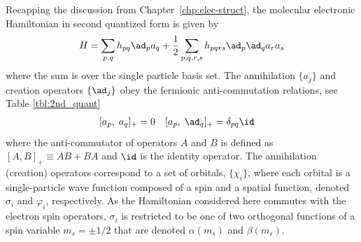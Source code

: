 \documentclass[11pt,oneside,final]{huthesis}%
\begin{document}
Recapping the discussion from Chapter~\ref{chp:elec-struct}, the molecular electronic Hamiltonian in second quantized form is given by
\begin{equation}\label{eq:ham2nd}
    H=\sum_{p,q}h_{pq}\ad_p a_q +\frac{1}{2}\sum_{p,q,r,s} h_{pqrs} \ad_p \ad_q a_r a_s
\end{equation}
where the sum is over the single particle basis set. The annihilation $\{a_j\}$ and creation operators $\{\ad_j\}$ obey the fermionic anti-commutation relations, see Table \ref{tbl:2nd_quant}
\begin{align}
&[a_p, \;a_q]_+=0& &[a_p, \;\ad_q]_+=\delta_{pq}\id
\label{:CCR}
\end{align}
where the anti-commutator of operators $A$ and $B$ is defined as $[A,B]_+\equiv AB+BA$ {and $\id$ is the identity operator.}
The annihilation (creation) operators correspond to a set of orbitals, $\{\chi_i\}$,  where each orbital is 
a single-particle wave function composed of a spin and a spatial function, denoted $\sigma_i$ and $\varphi_i$, 
respectively.  As the Hamiltonian considered here commutes with the electron spin operators, $\sigma_i$ is restricted to be one of
two orthogonal functions of a spin variable $m_s=\pm 1/2$ that are denoted $\alpha(m_s)$ and $\beta(m_s)$. 
\end{document}
